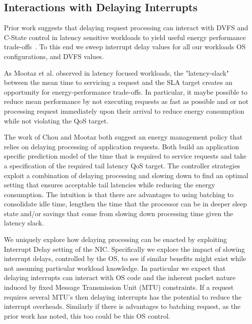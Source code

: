 


\subsection{Interactions with Delaying Interrupts}

Prior work suggests that delaying request processing can interact with DVFS and C-State control in latency sensitive workloads to yield useful energy performance trade-offs~\cite{mootaz, udpm}. To this end we sweep interrupt delay values for all our workloads OS configurations, and DVFS values.

As Mootaz et al.\cite{mootaz} observed in latency focused workloads, the "latency-slack" between the mean time to servicing a request and the SLA target creates an opportunity for energy-performance trade-offs.  In particular, it maybe possible to reduce mean performance by not executing requests as fast as possible and or not processing request immediately upon their arrival to reduce energy consumption while not violating the QoS target.  

The work of Chou and Mootaz both suggest an energy management policy that relies on delaying processing of application requests. Both build an application specific prediction model of the time that is required to service requests and take a specification of the required tail latency QoS target. The  controller strategies exploit a combination of delaying processing and slowing down to find an optimal setting that ensures acceptable tail latencies while reducing the energy consumption.  The intuition is that there are advantages to using batching to consolidate idle time, lengthen the time that the processor can be in deeper sleep state and/or savings that come from slowing down processing time given the latency slack.    

We uniquely explore how delaying processing can be enacted by exploiting Interrupt Delay setting of the NIC. Specifically we explore the impact of slowing interrupt delays, controlled by the OS, to see if similar benefits might exist while not assuming particular workload knowledge.  In particular we expect that delaying interrupts can interact with OS code and the inherent packet nature induced by fixed Message Transmission Unit (MTU) constraints. If a request requires several MTU's then delaying interrupts has the potential to reduce the interrupt overheads. Similarly if there is advantages to batching request, as the prior work has noted, this too could be this OS control.

